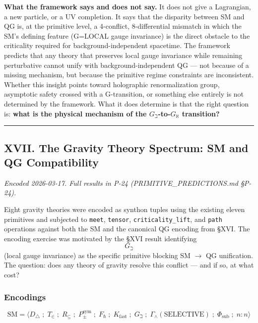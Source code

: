 \documentclass[12pt,a4paper]{article}
\begin{document}
\textbf{What the framework says and does not say.} It does not give a Lagrangian, a new particle, or a UV completion. It says that the disparity between SM and QG is, at the primitive level, a 4-conflict, 8-differential mismatch in which the SM's defining feature (G=LOCAL gauge invariance) is the direct obstacle to the criticality required for background-independent spacetime. The framework predicts that any theory that preserves local gauge invariance while remaining perturbative cannot unify with background-independent QG --- not because of a missing mechanism, but because the primitive regime constraints are inconsistent. Whether this insight points toward holographic renormalization group, asymptotic safety crossed with a G-transition, or something else entirely is not determined by the framework. What it does determine is that the right question is: \textbf{what is the physical mechanism of the $G_{\beth}$-to-$G_{\aleph}$ transition?}

\begin{center}
\rule{0.5\textwidth}{0.4pt}
\end{center}

\subsection{XVII. The Gravity Theory Spectrum: SM and QG Compatibility}

\emph{Encoded 2026-03-17. Full results in P-24 (PRIMITIVE\_PREDICTIONS.md §P-24).}

Eight gravity theories were encoded as synthon tuples using the existing eleven primitives and subjected to \texttt{meet}, \texttt{tensor}, \texttt{criticality\_lift}, and \texttt{path} operations against both the SM and the canonical QG encoding from §XVI. The encoding exercise was motivated by the §XVI result identifying $$G_{\beth}$$ (local gauge invariance) as the specific primitive blocking SM $\rightarrow$ QG unification. The question: does any theory of gravity resolve this conflict --- and if so, at what cost?

\subsubsection{Encodings}

\[\text{SM} = \langle D_{\triangle} \;;\; T_{\in} \;;\; R_{\subseteq} \;;\; P_{\pm}^{\text{sym}} \;;\; F_{\hbar} \;;\; K_{\text{fast}} \;;\; G_{\beth} \;;\; \Gamma_{\wedge}(\text{SELECTIVE}) \;;\; \Phi_{\text{sub}} \;;\; n{:}n \rangle\]
\end{document}
